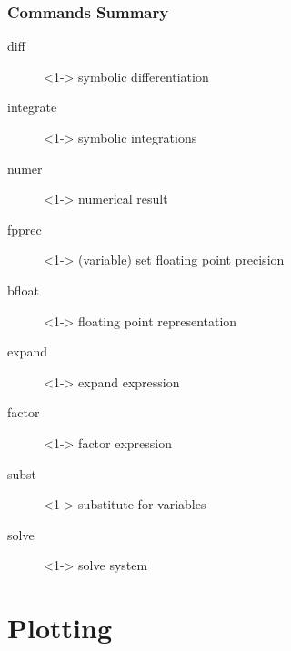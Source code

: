 \documentclass[12pt,usenames,pdftex]{beamer}
\begin{document}
\begin{frame}[<1->]
{\begin{maxima}
    \end{maxima}
  }
\end{frame}

\begin{frame}
  \frametitle{Commands Summary}
  \begin{description}
  \item[diff]<1-> symbolic differentiation
  \item[integrate]<1-> symbolic integrations
  \item[numer]<1-> numerical result
  \item[fpprec]<1-> (variable) set floating point precision    
  \item[bfloat]<1-> floating point representation
  \item[expand]<1-> expand expression
  \item[factor]<1-> factor expression
  \item[subst]<1-> substitute for variables
  \item[solve]<1-> solve system
  \end{description}
\end{frame}

\section{Plotting}
\end{document}
